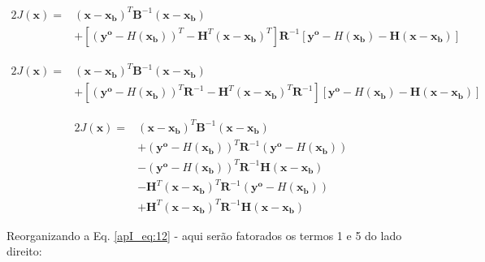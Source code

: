 \begin{equation}
  \label{apI_eq:10}
  \begin{aligned}
    2J(\mathbf{x}) = {} & (\mathbf{x} - \mathbf{x_{b}})^{T}\mathbf{B}^{-1}(\mathbf{x} - \mathbf{x_{b}}) \\
    & + [(\mathbf{y^{o}} - \textit{H}(\mathbf{x_{b}}))^{T} - \mathbf{H}^{T}(\mathbf{x} - \mathbf{x_{b}})^{T}]\mathbf{R}^{-1}[\mathbf{y^{o}} - \textit{H}(\mathbf{x_{b}}) - \mathbf{H}(\mathbf{x} - \mathbf{x_{b}})]
  \end{aligned}
\end{equation}

\begin{equation}
  \label{apI_eq:11}
  \begin{aligned}
    2J(\mathbf{x}) = {} & (\mathbf{x} - \mathbf{x_{b}})^{T}\mathbf{B}^{-1}(\mathbf{x} - \mathbf{x_{b}}) \\
    & + [(\mathbf{y^{o}} - \textit{H}(\mathbf{x_{b}}))^{T}\mathbf{R}^{-1} - \mathbf{H}^{T}(\mathbf{x} - \mathbf{x_{b}})^{T}\mathbf{R}^{-1}][\mathbf{y^{o}} - \textit{H}(\mathbf{x_{b}}) - \mathbf{H}(\mathbf{x} - \mathbf{x_{b}})]
  \end{aligned}
\end{equation}

\begin{equation}
  \label{apI_eq:12}
  \begin{aligned}
    2J(\mathbf{x}) = {} & (\mathbf{x} - \mathbf{x_{b}})^{T}\mathbf{B}^{-1}(\mathbf{x} - \mathbf{x_{b}}) \\
    & + (\mathbf{y^{o}} - \textit{H}(\mathbf{x_{b}}))^{T}\mathbf{R}^{-1}(\mathbf{y^{o}} - \textit{H}(\mathbf{x_{b}})) \\ 
                & - (\mathbf{y^{o}} - \textit{H}(\mathbf{x_{b}}))^{T}\mathbf{R}^{-1}\mathbf{H}(\mathbf{x} - \mathbf{x_{b}}) \\
                & - \mathbf{H}^{T}(\mathbf{x} - \mathbf{x_{b}})^{T}\mathbf{R}^{-1}(\mathbf{y^{o}} - \textit{H}(\mathbf{x_{b}})) \\ 
                & + \mathbf{H}^{T}(\mathbf{x} - \mathbf{x_{b}})^{T}\mathbf{R}^{-1}\mathbf{H}(\mathbf{x} - \mathbf{x_{b}})
  \end{aligned}  
\end{equation}

Reorganizando a Eq. \ref{apI_eq:12} - aqui serão fatorados os termos 1 e 5 do lado direito:

